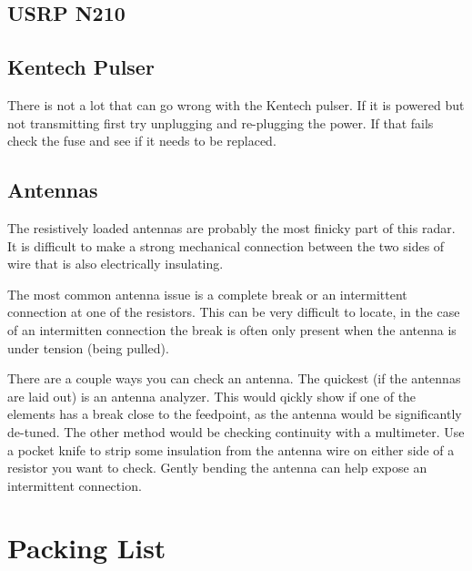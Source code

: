 \documentclass[titlepage]{article}
\begin{document}
\subsection{USRP N210} \label{trouble_usrp}


\subsection{Kentech Pulser} \label{trouble_xmit}
There is not a lot that can go wrong with the Kentech pulser. If it is powered but not transmitting first try unplugging and re-plugging the power. If that fails check the fuse and see if it needs to be replaced.

\subsection{Antennas} \label{trouble_ant}
The resistively loaded antennas are probably the most finicky part of this radar. It is difficult to make a strong mechanical connection between the two sides of wire that is also electrically insulating.

The most common antenna issue is a complete break or an intermittent connection at one of the resistors. This can be very difficult to locate, in the case of an intermitten connection the break is often only present when the antenna is under tension (being pulled).

There are a couple ways you can check an antenna. The quickest (if the antennas are laid out) is an antenna analyzer. This would qickly show if one of the elements has a break close to the feedpoint, as the antenna would be significantly de-tuned. The other method would be checking continuity with a multimeter. Use a pocket knife to strip some insulation from the antenna wire on either side of a resistor you want to check. Gently bending the antenna can help expose an intermittent connection.

\section{Packing List}
\end{document}
